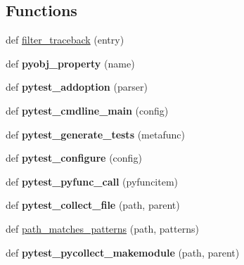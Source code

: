 \subsection*{Functions}
\begin{DoxyCompactItemize}
\item 
def \hyperlink{namespace__pytest_1_1python_a8834128df7c7408be62ca29220f7bbb3}{filter\+\_\+traceback} (entry)
\item 
\mbox{\label{namespace__pytest_1_1python_a2f3250b0f73b5b7df5937c694326748e}} 
def {\bfseries pyobj\+\_\+property} (name)
\item 
\mbox{\label{namespace__pytest_1_1python_a0433d82e7a73df2002bb41319a580c85}} 
def {\bfseries pytest\+\_\+addoption} (parser)
\item 
\mbox{\label{namespace__pytest_1_1python_a8132cfb1e3ad42b70be99b4152f1cac0}} 
def {\bfseries pytest\+\_\+cmdline\+\_\+main} (config)
\item 
\mbox{\label{namespace__pytest_1_1python_ab77f54743dcb77e1849b7bedc12fd90e}} 
def {\bfseries pytest\+\_\+generate\+\_\+tests} (metafunc)
\item 
\mbox{\label{namespace__pytest_1_1python_ab2766efa289a691acc564628885ce039}} 
def {\bfseries pytest\+\_\+configure} (config)
\item 
\mbox{\label{namespace__pytest_1_1python_a91e57411df397f54775eb59bb1b36303}} 
def {\bfseries pytest\+\_\+pyfunc\+\_\+call} (pyfuncitem)
\item 
\mbox{\label{namespace__pytest_1_1python_ac76c4024fd8552e538292157f10dad0d}} 
def {\bfseries pytest\+\_\+collect\+\_\+file} (path, parent)
\item 
def \hyperlink{namespace__pytest_1_1python_a624ad6ac9982dd401d284b5b893e1674}{path\+\_\+matches\+\_\+patterns} (path, patterns)
\item 
\mbox{\label{namespace__pytest_1_1python_ae65964034893b5afefa0cc62474db4e9}} 
def {\bfseries pytest\+\_\+pycollect\+\_\+makemodule} (path, parent)

\end{DoxyCompactItemize}
